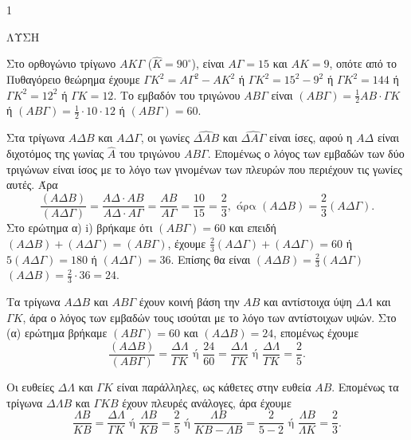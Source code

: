 \begin{ylh}{1}
    \item [Σημείωση: Η εικόνα περιέχει τη λύση της άσκησης και όχι την εκφώνηση.]
\end{ylh}
ΛΥΣΗ
\begin{alist}
    \item 
    \begin{rlist}
        \item Στο ορθογώνιο τρίγωνο $ΑΚΓ$ ($\hat{Κ} = 90^\circ$), είναι $ΑΓ = 15$ και $ΑΚ = 9$, οπότε από το Πυθαγόρειο θεώρημα έχουμε
        $ΓΚ^2 = ΑΓ^2 - ΑΚ^2$ ή $ΓΚ^2 = 15^2 - 9^2$ ή $ΓΚ^2 = 144$ ή $ΓΚ^2 = 12^2$ ή $ΓΚ = 12$.
        Το εμβαδόν του τριγώνου $ΑΒΓ$ είναι
        $(ΑΒΓ) = \frac{1}{2} ΑΒ \cdot ΓΚ$ ή $(ΑΒΓ) = \frac{1}{2} \cdot 10 \cdot 12$ ή $(ΑΒΓ) = 60$.

        \item Στα τρίγωνα $ΑΔΒ$ και $ΑΔΓ$, οι γωνίες $\hat{ΔΑΒ}$ και $\hat{ΔΑΓ}$ είναι ίσες, αφού η $ΑΔ$ είναι διχοτόμος της γωνίας $\hat{Α}$ του τριγώνου $ΑΒΓ$. Επομένως ο λόγος των εμβαδών των δύο τριγώνων είναι ίσος με το λόγο των γινομένων των πλευρών που περιέχουν τις γωνίες αυτές. Άρα
        \[ \frac{(ΑΔΒ)}{(ΑΔΓ)} = \frac{ΑΔ \cdot ΑΒ}{ΑΔ \cdot ΑΓ} = \frac{ΑΒ}{ΑΓ} = \frac{10}{15} = \frac{2}{3}, \text{ άρα } (ΑΔΒ) = \frac{2}{3}(ΑΔΓ). \]
        Στο ερώτημα α) i) βρήκαμε ότι $(ΑΒΓ) = 60$ και επειδή $(ΑΔΒ) + (ΑΔΓ) = (ΑΒΓ)$, έχουμε $\frac{2}{3}(ΑΔΓ) + (ΑΔΓ) = 60$ ή $5(ΑΔΓ) = 180$ ή $(ΑΔΓ) = 36$.
        Επίσης θα είναι $(ΑΔΒ) = \frac{2}{3}(ΑΔΓ)$ $(ΑΔΒ) = \frac{2}{3} \cdot 36 = 24$.
    \end{rlist}

    \item 
    \begin{rlist}
        \item Τα τρίγωνα $ΑΔΒ$ και $ΑΒΓ$ έχουν κοινή βάση την $ΑΒ$ και αντίστοιχα ύψη $ΔΛ$ και $ΓΚ$, άρα ο λόγος των εμβαδών τους ισούται με το λόγο των αντίστοιχων υψών.
        Στο (α) ερώτημα βρήκαμε $(ΑΒΓ) = 60$ και $(ΑΔΒ) = 24$, επομένως έχουμε
        \[ \frac{(ΑΔΒ)}{(ΑΒΓ)} = \frac{ΔΛ}{ΓΚ} \text{ ή } \frac{24}{60} = \frac{ΔΛ}{ΓΚ} \text{ ή } \frac{ΔΛ}{ΓΚ} = \frac{2}{5}. \]
        
        \item Οι ευθείες $ΔΛ$ και $ΓΚ$ είναι παράλληλες, ως κάθετες στην ευθεία $ΑΒ$. Επομένως τα τρίγωνα $ΔΛΒ$ και $ΓΚΒ$ έχουν πλευρές ανάλογες, άρα έχουμε
        \[ \frac{ΛΒ}{ΚΒ} = \frac{ΔΛ}{ΓΚ} \text{ ή } \frac{ΛΒ}{ΚΒ} = \frac{2}{5} \text{ ή } \frac{ΛΒ}{ΚΒ-ΛΒ} = \frac{2}{5-2} \text{ ή } \frac{ΛΒ}{ΛΚ} = \frac{2}{3}. \]
    \end{rlist}
\end{alist}